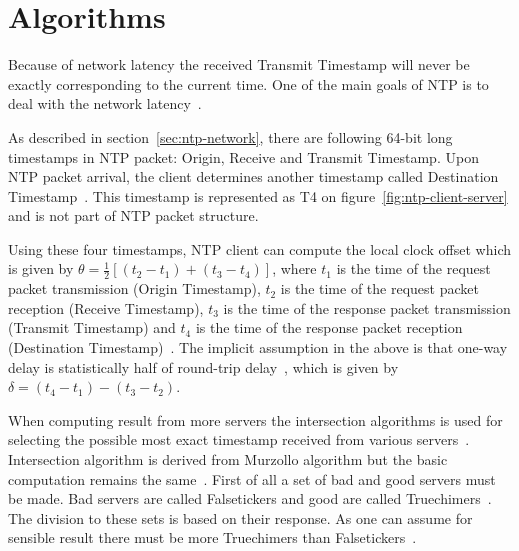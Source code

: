 
\section{Algorithms}\label{sec:ntp-algorithms}
Because of network latency the received Transmit Timestamp will never be exactly
corresponding to the current time.
One of the main goals of NTP is to deal with the network latency~\cite{ntp-overview}.

As described in section~\ref{sec:ntp-network},
there are following 64-bit long timestamps in NTP packet: Origin, Receive and Transmit Timestamp.
Upon NTP packet arrival, the client determines another timestamp called
Destination Timestamp~\cite{rfc5905}.
This timestamp is represented as T4 on figure~\ref{fig:ntp-client-server}
and is not part of NTP packet structure.

Using these four timestamps, NTP client can compute
the local clock offset which is given by $\theta = \frac{1}{2}[(t_2 - t_1) + (t_3 - t_4)]$,
where $t_1$ is the time of the request packet transmission (Origin Timestamp),
$t_2$ is the time of the request packet reception (Receive Timestamp),
$t_3$ is the time of the response packet transmission (Transmit Timestamp) and
$t_4$ is the time of the response packet reception (Destination Timestamp)~\cite{ntp-algor,rfc5905}.
The implicit assumption in the above is that one-way delay is
statistically half of round-trip delay~\cite{rfc5905},
which is given by $\delta = (t_4 - t_1) - (t_3 - t_2)$.

When computing result from more servers the intersection algorithms is used
for selecting the possible most exact timestamp received from various servers~\cite{ntp-improved-algor,rfc5905}.
Intersection algorithm is derived from Murzollo algorithm but the basic
computation remains the same~\cite{ntp-history}.
First of all a set of bad and good servers must be made.
Bad servers are called Falsetickers and good are called Truechimers~\cite{rfc5905}.
The division to these sets is based on their response.
As one can assume for sensible result there must be more Truechimers than Falsetickers~\cite{rfc5905}.

